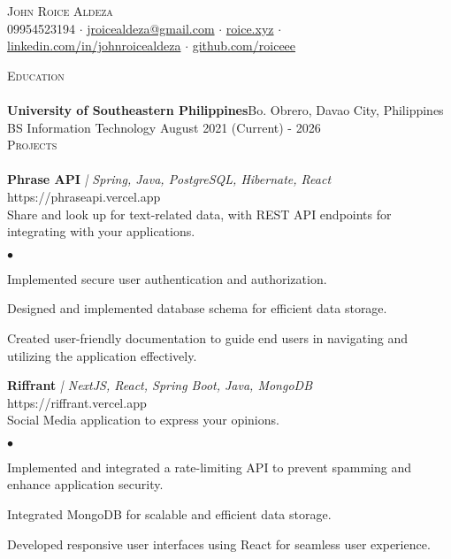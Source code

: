 \documentclass[a4paper]{article}
\newcommand{\lineunder} {
        \vspace*{-8pt} \\
        \hspace*{-18pt} \hrulefill \\
    }
\newcommand{\header} [1] {
        {\vspace*{4mm} \hspace*{-18pt}\vspace*{8pt} \textsc{#1}}
        \vspace*{-6pt} \lineunder
    }
\newenvironment{achievements}{
        \begin{list}
            {$\bullet$}{\topsep 0pt \itemsep -2pt}}{\vspace*{4pt}
        \end{list}
    }
\begin{document}
    \vspace*{-40pt}

    \begin{center}
        {\Huge \scshape {John Roice Aldeza}}\\
        \vspace{2mm}
    09954523194 $\cdot$ \href{mailto:jroicealdeza@gmail.com}{jroicealdeza@gmail.com} $\cdot$ \href{https://roice.xyz}{roice.xyz} $\cdot$ \href{https://www.linkedin.com/in/johnroicealdeza}{linkedin.com/in/johnroicealdeza} $\cdot$ 
    \href{https://www.github.com/roiceee}{github.com/roiceee}
    \end{center}
    \vspace{-8pt}
    \header{Education}
    \textbf{University of Southeastern Philippines}\hfill Bo. Obrero, Davao City, Philippines\\
    BS Information Technology \hfill August 2021 (Current) - 2026\\


    \header{Projects}

    {\textbf{Phrase API}} {\sl | Spring, Java, PostgreSQL, Hibernate, React} \hfill https://phraseapi.vercel.app\\
    \vspace{1mm}
    Share and look up for text-related data, with REST API endpoints for integrating with your applications.\\
    \begin{achievements}
        \item Implemented secure user authentication and authorization.
        \item Designed and implemented database schema for efficient data storage.
        \item Created user-friendly documentation to guide end users in navigating and utilizing the application effectively.
    \end{achievements}
    \vspace*{3mm}

    {\textbf{Riffrant}} {\sl | NextJS, React, Spring Boot, Java, MongoDB} \hfill https://riffrant.vercel.app\\
    \vspace{1mm}
    Social Media application to express your opinions.\\
    \begin{achievements}
       \item Implemented and integrated a rate-limiting API to prevent spamming and enhance application security.
        \item Integrated MongoDB for scalable and efficient data storage.
        \item Developed responsive user interfaces using React for seamless user experience.
    \end{achievements}
    \vspace*{3mm}
\end{document}

